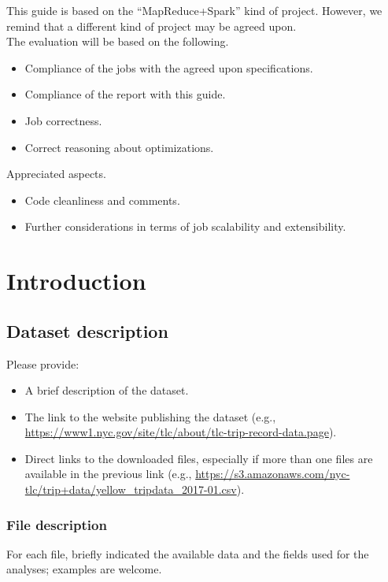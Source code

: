 \documentclass[10pt]{article}
\begin{document}
This guide is based on the ``MapReduce+Spark'' kind of project. However, we remind that a different kind of project may be agreed upon.
\\

The evaluation will be based on the following.
\begin{itemize}
\item Compliance of the jobs with the agreed upon specifications.
\item Compliance of the report with this guide.
\item Job correctness.
\item Correct reasoning about optimizations.
\end{itemize}

Appreciated aspects.
\begin{itemize}
\item Code cleanliness and comments.
\item Further considerations in terms of job scalability and extensibility.
\end{itemize}



\section{Introduction}
\subsection{Dataset description}

Please provide:
\begin{itemize}
\item A brief description of the dataset.
\item The link to the website publishing the dataset (e.g., \url{https://www1.nyc.gov/site/tlc/about/tlc-trip-record-data.page}).
\item Direct links to the downloaded files, especially if more than one files are available in the previous link (e.g., \url{https://s3.amazonaws.com/nyc-tlc/trip+data/yellow_tripdata_2017-01.csv}).
\end{itemize}

\subsubsection{File description}

For each file, briefly indicated the available data and the fields used for the analyses; examples are welcome.
\end{document}
